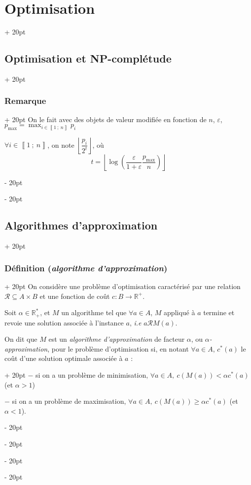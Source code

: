 \documentclass[a4paper, 12pt, twoside]{article}
\newcommand{\R}{\mathbb{R}} %
\newcommand{\nset}[2]{\left\llbracket #1\ ;\ #2 \right\rrbracket}
\newcommand{\lr}[1]{\left( #1 \right)}
\newcommand{\floor}[1]{\left\lfloor #1 \right\rfloor}
\renewcommand{\ge}{\geqslant}
\newcommand{\ind}[1][20pt]{\advance\leftskip + #1}
\newcommand{\deind}[1][20pt]{\advance\leftskip - #1}
\newenvironment{indt}[2][20pt]{#2 \par \ind[#1]}{\par \deind} %
\newcommand{\1}{\mathbbm 1}
\begin{document}
\begin{indt}{\section{Optimisation}}
\begin{indt}{\subsection{Optimisation et \textbf{NP}-complétude}}
\begin{indt}{\subsubsection{Remarque}}
                On le fait avec des objets de valeur modifiée en fonction de $n$, $\varepsilon$, $p_{\max} = \max_{i \in \nset 1 n} p_i$

                $\displaystyle \forall i \in \nset 1 n$, on note $\floor{\dfrac{p_i}{2^t}}$, où
                \[
                    t = \floor{\log\!\lr{\dfrac{\varepsilon}{1 + \varepsilon} \dfrac{p_{\max}}{n}}}
                \]
            \end{indt}
        \end{indt}

        \vspace{12pt}
        
        \begin{indt}{\subsection{Algorithmes d'approximation}}
            \begin{indt}{\subsubsection{Définition (\textit{algorithme d'approximation})}}
                On considère une problème d'optimisation caractérisé par une relation $\mathcal R \subseteq A \times B$ et une fonction de coût $c : B \longrightarrow \R^+$.

                Soit $\alpha \in \R_+^*$, et $M$ un algorithme tel que $\forall a \in A$, $M$ appliqué à $a$ termine et revoie une solution associée à l'instance $a$, \textit{i.e} $a \mathcal R M(a)$.

                On dit que $M$ est un \emph{algorithme d'approximation} de facteur $\alpha$, ou \emph{$\alpha$-approximation}, pour le problème d'optimisation si, en notant $\forall a \in A$, $c^*(a)$ le coût d'une solution optimale associée à $a$ :
                \begin{indt}{}
                    $-$ si on a un problème de minimisation, $\forall a \in A,\ c(M(a)) < \alpha c^*(a)$ (et $\alpha > 1$)
                    
                    $-$ si on a un problème de maximisation, $\forall a \in A,\ c(M(a)) \ge \alpha c^*(a)$ (et $\alpha < 1$).
                \end{indt}
            \end{indt}

            \vspace{12pt}
            

\end{indt}
\end{indt}
\end{document}
